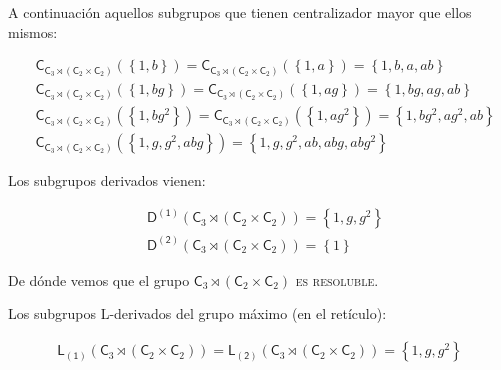 \documentclass[12pt,a4paper,fleqn,spanish,final,openright]{extbook}
\theoremstyle{definition}
\theoremstyle{remark}
\begin{document}
A continuación aquellos subgrupos que tienen centralizador mayor que ellos mismos:

\begin{align*}
&\mathsf{C}_{{\mathsf{C}_{3}}\rtimes
({\mathsf{C}_{2}}   \times   {\mathsf{C}_{2}})}\left({\left\lbrace{1,b}\right\rbrace}\right) =
\mathsf{C}_{{\mathsf{C}_{3}}\rtimes
({\mathsf{C}_{2}}   \times   {\mathsf{C}_{2}})}\left({\left\lbrace{1,a}\right\rbrace}\right) =
{\left\lbrace{1,b,a,ab}\right\rbrace}\\
&\mathsf{C}_{{\mathsf{C}_{3}}\rtimes
({\mathsf{C}_{2}}   \times   {\mathsf{C}_{2}})}\left({\left\lbrace{1,bg}\right\rbrace}\right) =
\mathsf{C}_{{\mathsf{C}_{3}}
\rtimes({\mathsf{C}_{2}}   \times   {\mathsf{C}_{2}})}\left({\left\lbrace{1,ag}\right\rbrace}\right) =
{\left\lbrace{1,bg,ag,ab}\right\rbrace}\\
&\mathsf{C}_{{\mathsf{C}_{3}}
\rtimes
({\mathsf{C}_{2}}   \times   {\mathsf{C}_{2}})}\left({\left\lbrace{1,bg^2}\right\rbrace}\right) =
\mathsf{C}_{{\mathsf{C}_{3}}
\rtimes
({\mathsf{C}_{2}}   \times   {\mathsf{C}_{2}})}\left({\left\lbrace{1,ag^2}\right\rbrace}\right) = {\left\lbrace{1,bg^2,ag^2,ab}\right\rbrace}\\
&\mathsf{C}_{{\mathsf{C}_{3}}\rtimes({\mathsf{C}_{2}}   \times   {\mathsf{C}_{2}})}\left({\left\lbrace{1,g,g^2,abg}\right\rbrace}\right) = {\left\lbrace{1,g,g^2,ab,abg,abg^2}\right\rbrace}
\end{align*}


Los subgrupos derivados vienen:

\begin{align*}
&\mathsf{D^{(1)}}{\left({\mathsf{C}_{3}}\rtimes({\mathsf{C}_{2}}   \times   {\mathsf{C}_{2}})\right)} = {\left\lbrace{1,g,g^2}\right\rbrace}\\
&\mathsf{D^{(2)}}{\left({\mathsf{C}_{3}}\rtimes({\mathsf{C}_{2}}   \times   {\mathsf{C}_{2}})\right)} = {\left\lbrace{1}\right\rbrace}
\end{align*}

De dónde vemos que el grupo ${\mathsf{C}_{3}}\rtimes({\mathsf{C}_{2}}   \times   {\mathsf{C}_{2}})$ \textsc{ es resoluble}.

Los subgrupos L-derivados del grupo máximo (en el retículo):

\begin{align*}
\mathsf{L_{(1)}}{\left({\mathsf{C}_{3}}\rtimes({\mathsf{C}_{2}}   \times   {\mathsf{C}_{2}})
\right)} = \mathsf{L_{(2)}}{\left({\mathsf{C}_{3}}\rtimes({\mathsf{C}_{2}}   \times   {\mathsf{C}_{2}})
\right)} = {\left\lbrace{1,g,g^2}\right\rbrace}
\end{align*}
\end{document}
